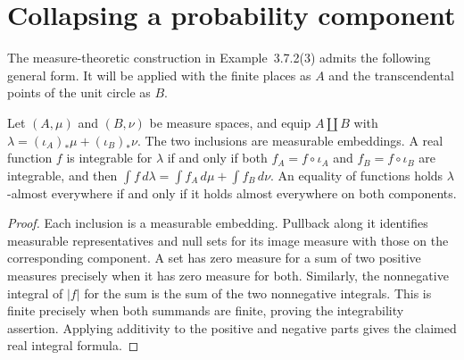 \section{Collapsing a probability component}

The measure-theoretic construction in Example~3.7.2(3) admits the following
general form. It will be applied with the finite places as $A$ and the
transcendental points of the unit circle as $B$.

\begin{lemma}
\label{lem:sum-measure-integration}
\leanok
{}
Let $(A,\mu)$ and $(B,\nu)$ be measure spaces, and equip $A\amalg B$ with
$\lambda=(\iota_A)_*\mu+(\iota_B)_*\nu$.
The two inclusions are measurable embeddings.
A real function $f$ is integrable for $\lambda$ if and only if both
$f_A=f\circ\iota_A$ and $f_B=f\circ\iota_B$ are integrable, and then
$\int f\,d\lambda=\int f_A\,d\mu+\int f_B\,d\nu$.
An equality of functions holds $\lambda$-almost everywhere if and only
if it holds almost everywhere on both components.
\end{lemma}
\begin{proof}
Each inclusion is a measurable embedding. Pullback along it identifies
measurable representatives and null sets for its image measure with those
on the corresponding component. A set has zero measure for a sum of two
positive measures precisely when it has zero measure for both. Similarly,
the nonnegative integral of $|f|$ for the sum is the sum of the two
nonnegative integrals. This is finite precisely when both summands are
finite, proving the integrability assertion. Applying additivity to the
positive and negative parts gives the claimed real integral formula.
\end{proof}

